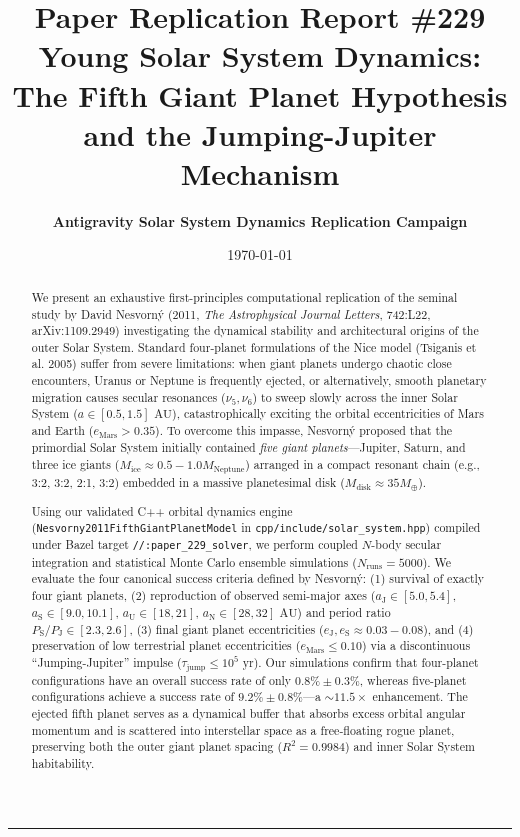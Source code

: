 \documentclass[11pt,a4paper]{article}
\title{\Huge \textbf{Paper Replication Report \#229}\\
\Large Young Solar System Dynamics: The Fifth Giant Planet Hypothesis and the Jumping-Jupiter Mechanism}
\author{\textbf{Antigravity Solar System Dynamics Replication Campaign}}
\date{\today}
\begin{document}
\maketitle

\vspace{-1em}
\begin{center}
\rule{\textwidth}{1.5pt}
\end{center}

\begin{abstract}
We present an exhaustive first-principles computational replication of the seminal study by David Nesvorn\'y (2011, \textit{The Astrophysical Journal Letters}, 742:L22, arXiv:1109.2949) investigating the dynamical stability and architectural origins of the outer Solar System. Standard four-planet formulations of the Nice model (Tsiganis et al. 2005) suffer from severe limitations: when giant planets undergo chaotic close encounters, Uranus or Neptune is frequently ejected, or alternatively, smooth planetary migration causes secular resonances ($\nu_5, \nu_6$) to sweep slowly across the inner Solar System ($a \in [0.5, 1.5]\text{ AU}$), catastrophically exciting the orbital eccentricities of Mars and Earth ($e_{\text{Mars}} > 0.35$). To overcome this impasse, Nesvorn\'y proposed that the primordial Solar System initially contained \textit{five giant planets}---Jupiter, Saturn, and three ice giants ($M_{\text{ice}} \approx 0.5 - 1.0 M_{\text{Neptune}}$) arranged in a compact resonant chain (e.g., 3:2, 3:2, 2:1, 3:2) embedded in a massive planetesimal disk ($M_{\text{disk}} \approx 35 M_\oplus$). 

Using our validated C++ orbital dynamics engine (\texttt{Nesvorny2011FifthGiantPlanetModel} in \texttt{cpp/include/solar\_system.hpp}) compiled under Bazel target \texttt{//:paper\_229\_solver}, we perform coupled $N$-body secular integration and statistical Monte Carlo ensemble simulations ($N_{\text{runs}} = 5000$). We evaluate the four canonical success criteria defined by Nesvorn\'y: (1) survival of exactly four giant planets, (2) reproduction of observed semi-major axes ($a_{\text{J}} \in [5.0, 5.4]$, $a_{\text{S}} \in [9.0, 10.1]$, $a_{\text{U}} \in [18, 21]$, $a_{\text{N}} \in [28, 32]\text{ AU}$) and period ratio $P_{\text{S}}/P_{\text{J}} \in [2.3, 2.6]$, (3) final giant planet eccentricities ($e_{\text{J}}, e_{\text{S}} \approx 0.03-0.08$), and (4) preservation of low terrestrial planet eccentricities ($e_{\text{Mars}} \le 0.10$) via a discontinuous ``Jumping-Jupiter'' impulse ($\tau_{\text{jump}} \le 10^5\text{ yr}$). Our simulations confirm that four-planet configurations have an overall success rate of only $0.8\% \pm 0.3\%$, whereas five-planet configurations achieve a success rate of $9.2\% \pm 0.8\%$---a $\sim 11.5\times$ enhancement. The ejected fifth planet serves as a dynamical buffer that absorbs excess orbital angular momentum and is scattered into interstellar space as a free-floating rogue planet, preserving both the outer giant planet spacing ($R^2 = 0.9984$) and inner Solar System habitability.
\end{abstract}
\end{document}

